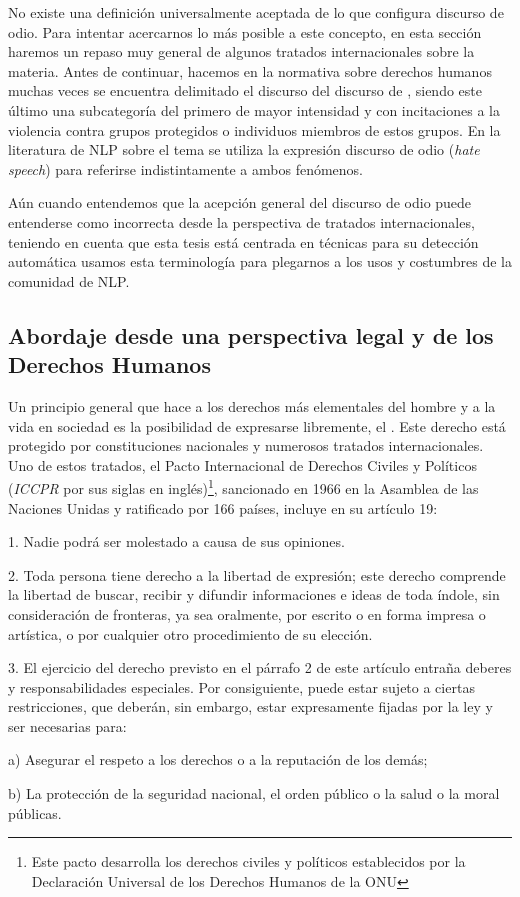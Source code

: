 No existe una definición universalmente aceptada de lo que configura discurso de odio. Para intentar acercarnos lo más posible a este concepto, en esta sección haremos un repaso muy general de algunos tratados internacionales sobre la materia. Antes de continuar, hacemos  en la normativa sobre derechos humanos muchas veces se encuentra delimitado el discurso  del discurso de , siendo este último una subcategoría del primero de mayor intensidad y con incitaciones a la violencia contra grupos protegidos o individuos miembros de estos grupos. En la literatura de NLP sobre el tema se utiliza la expresión discurso de odio (\emph{hate speech}) para referirse indistintamente a ambos fenómenos.

Aún cuando entendemos que la acepción general del discurso de odio puede entenderse como incorrecta desde la perspectiva de tratados internacionales, teniendo en cuenta que esta tesis está centrada en técnicas para su detección automática usamos esta terminología para plegarnos a los usos y costumbres de la comunidad de NLP.

\subsection{Abordaje desde una perspectiva legal y de los Derechos Humanos}

Un principio general que hace a los derechos más elementales del hombre y a la vida en sociedad es la posibilidad de expresarse libremente, el . Este derecho está protegido por constituciones nacionales y numerosos tratados internacionales. Uno de estos tratados, el Pacto Internacional de Derechos Civiles y Políticos (\emph{ICCPR} por sus siglas en inglés)\footnote{Este pacto desarrolla los derechos civiles y políticos establecidos por la Declaración Universal de los Derechos Humanos de la ONU}, sancionado en 1966 en la Asamblea de las Naciones Unidas y ratificado por 166 países, incluye en su artículo 19:

\begin{displayquote}
1. Nadie podrá ser molestado a causa de sus opiniones.

2. Toda persona tiene derecho a la libertad de expresión; este derecho comprende la libertad de buscar, recibir y difundir informaciones e ideas de toda índole, sin consideración de fronteras, ya sea oralmente, por escrito o en forma impresa o artística, o por cualquier otro procedimiento de su elección.

3. El ejercicio del derecho previsto en el párrafo 2 de este artículo entraña deberes y responsabilidades especiales. Por consiguiente, puede estar sujeto a ciertas restricciones, que deberán, sin embargo, estar expresamente fijadas por la ley y ser necesarias para:

a) Asegurar el respeto a los derechos o a la reputación de los demás;

b) La protección de la seguridad nacional, el orden público o la salud o la moral públicas.
\end{displayquote}

